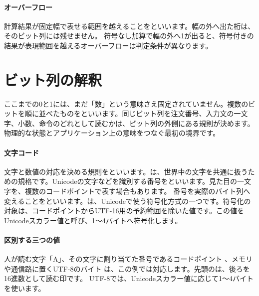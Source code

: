 \paragraph{オーバーフロー}
        計算結果が固定幅で表せる範囲を越えることをといいます。幅の外へ出た桁は、そのビット列には残せません。
        符号なし加算で幅の外へ1が出ると、符号付きの結果が表現範囲を越えるオーバーフローは判定条件が異なります。

\par
\endgroup
\par
\endgroup




\section{ビット列の解釈}
\label{sec:01-digital-computer-04}

ここまでの0と1には、まだ「数」という意味さえ固定されていません。複数のビットを順に並べたものをといいます。同じビット列を注文番号、入力文の一文字、小数、命令のどれとして読むかは、ビット列の外側にある規則が決めます。物理的な状態とアプリケーション上の意味をつなぐ最初の境界です。

\begingroup
\begingroup
\paragraph{文字コード}
        文字と数値の対応を決める規則をといいます。は、世界中の文字を共通に扱うための規格です。Unicodeの文字などを識別する番号をといいます。見た目の一文字を、複数のコードポイントで表す場合もあります。
        番号を実際のバイト列へ変えることをといいます。は、Unicodeで使う符号化方式の一つです。符号化の対象は、コードポイントからUTF-16用の予約範囲を除いた値です。この値をUnicodeスカラー値と呼び、1〜4バイトへ符号化します。

\paragraph{区別する三つの値}
        人が読む文字「A」、その文字に割り当てた番号であるコードポイント 、メモリや通信路に置くUTF-8のバイト  は、この例では対応します。先頭のは、後ろを16進数として読む印です。
        UTF-8では、Unicodeスカラー値に応じて1〜4バイトを使います。

